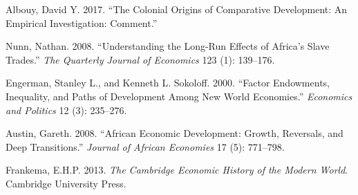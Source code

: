 \documentclass[12pt]{article}
\begin{document}
\begin{thebibliography}{99}
Albouy, David Y. 2017. “The Colonial Origins of Comparative Development: An Empirical Investigation: Comment.”

Nunn, Nathan. 2008. “Understanding the Long-Run Effects of Africa’s Slave Trades.” \textit{The Quarterly Journal of Economics} 123 (1): 139–176. 

Engerman, Stanley L., and Kenneth L. Sokoloff. 2000. “Factor Endowments, Inequality, and Paths of Development Among New World Economies.” \textit{Economics and Politics} 12 (3): 235–276. 

Austin, Gareth. 2008. “African Economic Development: Growth, Reversals, and Deep Transitions.” \textit{Journal of African Economies} 17 (5): 771–798. 

Frankema, E.H.P. 2013. \textit{The Cambridge Economic History of the Modern World}. Cambridge University Press.

\end{thebibliography}
\end{document}
